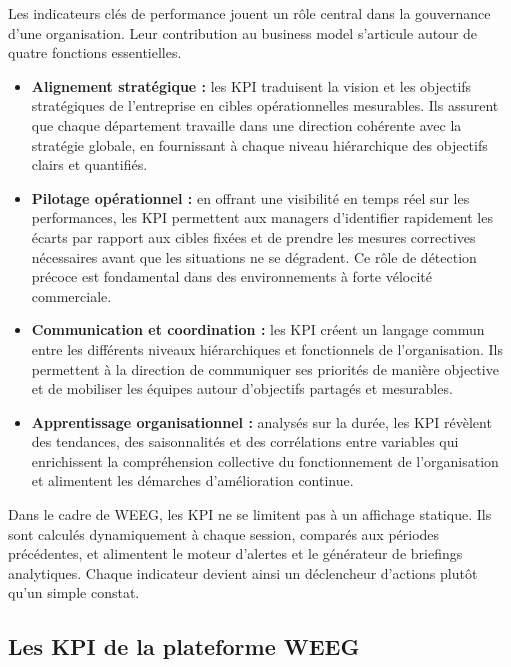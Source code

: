 \documentclass[a4paper,12pt]{report}
\begin{document}
Les indicateurs clés de performance jouent un rôle central dans la gouvernance
d'une organisation. Leur contribution au business model s'articule autour de
quatre fonctions essentielles.

\begin{itemize}
    \item \textbf{Alignement stratégique :} les KPI traduisent la vision et les
    objectifs stratégiques de l'entreprise en cibles opérationnelles mesurables.
    Ils assurent que chaque département travaille dans une direction cohérente
    avec la stratégie globale, en fournissant à chaque niveau hiérarchique des
    objectifs clairs et quantifiés.

    \item \textbf{Pilotage opérationnel :} en offrant une visibilité en temps
    réel sur les performances, les KPI permettent aux managers d'identifier
    rapidement les écarts par rapport aux cibles fixées et de prendre les mesures
    correctives nécessaires avant que les situations ne se dégradent. Ce rôle de
    détection précoce est fondamental dans des environnements à forte vélocité
    commerciale.

    \item \textbf{Communication et coordination :} les KPI créent un langage
    commun entre les différents niveaux hiérarchiques et fonctionnels de
    l'organisation. Ils permettent à la direction de communiquer ses priorités de
    manière objective et de mobiliser les équipes autour d'objectifs partagés et
    mesurables.

    \item \textbf{Apprentissage organisationnel :} analysés sur la durée, les KPI
    révèlent des tendances, des saisonnalités et des corrélations entre variables
    qui enrichissent la compréhension collective du fonctionnement de
    l'organisation et alimentent les démarches d'amélioration continue.
\end{itemize}

Dans le cadre de WEEG, les KPI ne se limitent pas à un affichage statique. Ils
sont calculés dynamiquement à chaque session, comparés aux périodes précédentes,
et alimentent le moteur d'alertes et le générateur de briefings analytiques.
Chaque indicateur devient ainsi un déclencheur d'actions plutôt qu'un simple
constat.

\subsection{Les KPI de la plateforme WEEG}
\end{document}
